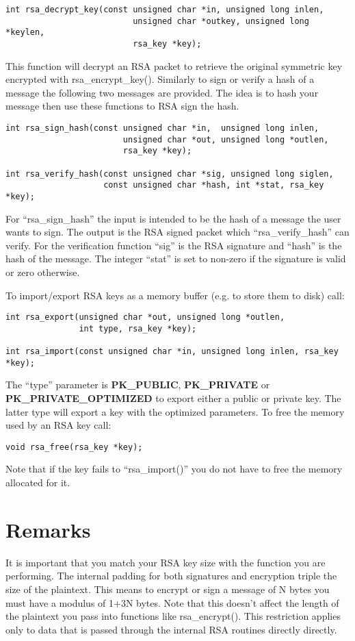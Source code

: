 \documentclass{book}
\begin{document}
\begin{verbatim}
int rsa_decrypt_key(const unsigned char *in, unsigned long inlen, 
                          unsigned char *outkey, unsigned long *keylen, 
                          rsa_key *key);
\end{verbatim}

This function will decrypt an RSA packet to retrieve the original symmetric key encrypted with rsa\_encrypt\_key().  
Similarly to sign or verify a hash of a message the following two messages are provided.  The idea is to hash your message 
then use these functions to RSA sign the hash.  
\begin{verbatim}
int rsa_sign_hash(const unsigned char *in,  unsigned long inlen, 
                        unsigned char *out, unsigned long *outlen, 
                        rsa_key *key);

int rsa_verify_hash(const unsigned char *sig, unsigned long siglen,
                    const unsigned char *hash, int *stat, rsa_key *key);
\end{verbatim}
For ``rsa\_sign\_hash'' the input is intended to be the hash of a message the user wants to sign.  The output is the 
RSA signed packet which ``rsa\_verify\_hash'' can verify.  For the verification function ``sig'' is the RSA signature
and ``hash'' is the hash of the message.  The integer ``stat'' is set to non-zero if the signature is valid or zero 
otherwise.

To import/export RSA keys as a memory buffer (e.g. to store them to disk) call:
\begin{verbatim}
int rsa_export(unsigned char *out, unsigned long *outlen, 
               int type, rsa_key *key);

int rsa_import(const unsigned char *in, unsigned long inlen, rsa_key *key);
\end{verbatim}

The ``type'' parameter is {\bf PK\_PUBLIC}, {\bf PK\_PRIVATE} or {\bf PK\_PRIVATE\_OPTIMIZED} to export either a public or 
private key.  The latter type will export a key with the optimized parameters.  To free the memory used by an RSA key call:
\begin{verbatim}
void rsa_free(rsa_key *key);
\end{verbatim}

Note that if the key fails to ``rsa\_import()'' you do not have to free the memory allocated for it.

\section{Remarks}
It is important that you match your RSA key size with the function you are performing.  The internal padding for both
signatures and encryption triple the size of the plaintext.  This means to encrypt or sign
a message of N bytes you must have a modulus of 1+3N bytes.  Note that this doesn't affect the length of the plaintext 
you pass into functions like rsa\_encrypt().  This restriction applies only to data that is passed through the
internal RSA routines directly directly.
\end{document}

